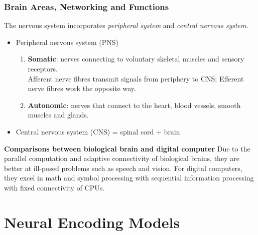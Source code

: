 \documentclass[11pt]{article}
\begin{document}
\subsubsection{Brain Areas, Networking and Functions}
The nervous system incorporates \textit{peripheral system} and \textit{central nervous system}.
\begin{itemize}
    \item Peripheral nervous system (PNS)
    \begin{enumerate}
        \item \textbf{Somatic}: nerves connecting to voluntary skeletal muscles and sensory receptors. \\
        Afferent nerve fibres transmit signals from periphery to CNS; Efferent nerve fibres work the opposite way.
        \item \textbf{Autonomic}: nerves that connect to the heart, blood vessels, smooth muscles and glands.
    \end{enumerate}
    \item Central nervous system (CNS) = spinal cord + brain
\end{itemize}
\textbf{Comparisons between biological brain and digital computer}
Due to the parallel computation and adaptive connectivity of biological brains, they are better at ill-posed problems such as speech and vision. For digital computers, they excel in math and symbol processing with sequential information processing with fixed connectivity of CPUs.

\newpage
\section{Neural Encoding Models}
\end{document}
